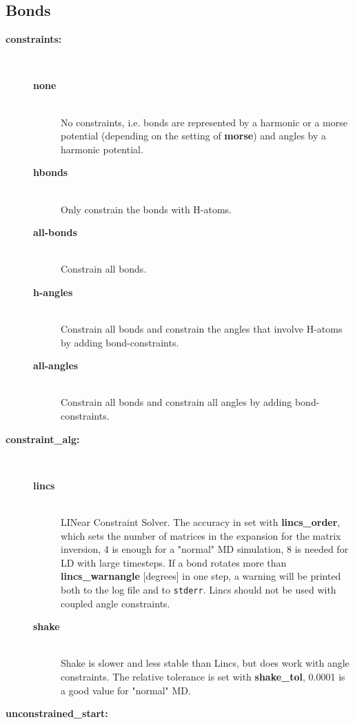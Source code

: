 \subsection{ Bonds}
\begin{description}
\item[{\bf constraints:}]\mbox{}\\
\vspace{-2ex}\begin{description}
\item[{\bf none}]\mbox{}\\
No constraints, i.e. bonds are represented by a harmonic or a
morse potential (depending on the setting of {\bf morse}) and angles
by a harmonic potential.
\item[{\bf hbonds}]\mbox{}\\
Only constrain the bonds with H-atoms.
\item[{\bf all-bonds}]\mbox{}\\
Constrain all bonds.
\item[{\bf h-angles}]\mbox{}\\
Constrain all bonds and constrain the angles that involve H-atoms
by adding bond-constraints.
\item[{\bf all-angles}]\mbox{}\\
Constrain all bonds and constrain all angles by adding bond-constraints.
\end{description}
\item[{\bf constraint\_alg:}]\mbox{}\\
\vspace{-2ex}\begin{description}
\item[{\bf lincs}]\mbox{}\\
LINear Constraint Solver. The accuracy in set with
{\bf lincs\_order}, which sets the number of matrices in the expansion
for the matrix inversion, 4 is enough for a "normal" MD simulation, 8 is
needed for LD with large timesteps. If a bond rotates more than
{\bf lincs\_warnangle} [degrees] in one step, 
a warning will be printed both to the log file and to {\tt stderr}. 
Lincs should not be used with coupled angle constraints.
\item[{\bf shake}]\mbox{}\\
Shake is slower and less stable than Lincs, but does work with 
angle constraints. 
The relative tolerance is set with {\bf shake\_tol}, 0.0001 is a good value
for "normal" MD. 
\end{description}
\item[{\bf unconstrained\_start:}]\mbox{}\\

\end{description}
